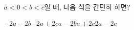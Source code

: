 $a<0<b<c$일 때, 다음 식을 간단히 하면?
\begin{choices32}{$-2a-2b$}{$-2a+2c$}{$a-2b$}{$a+2c$}{$2a-2c$}\end{choices32}
